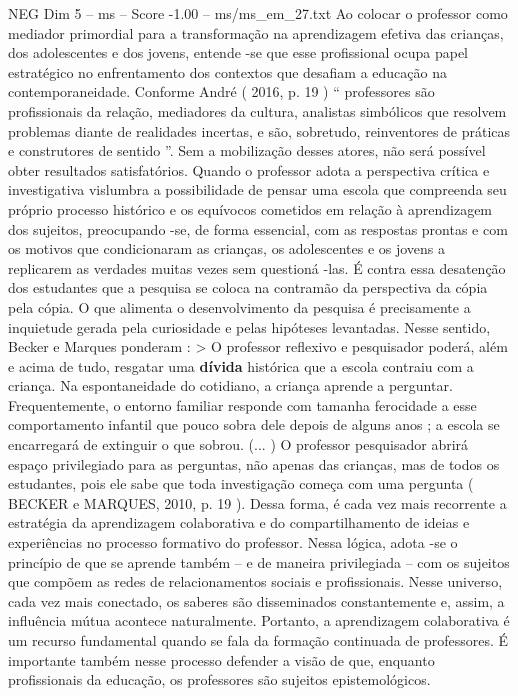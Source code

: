 \begin{textsample}{NEG Dim 5 – ms – Score -1.00 – ms/ms\_em\_27.txt}
Ao colocar o professor como mediador primordial para a transformação na aprendizagem efetiva das crianças, dos adolescentes e dos jovens, entende -se que esse profissional ocupa papel estratégico no enfrentamento dos contextos que desafiam a educação na contemporaneidade.
Conforme André ( 2016, p. 19 ) “ professores são profissionais da relação, mediadores da cultura, analistas simbólicos que resolvem problemas diante de realidades incertas, e são, sobretudo, reinventores de práticas e construtores de sentido ”.
Sem a mobilização desses atores, não será possível obter resultados satisfatórios.
Quando o professor adota a perspectiva crítica e investigativa vislumbra a possibilidade de pensar uma escola que compreenda seu próprio processo histórico e os equívocos cometidos em relação à aprendizagem dos sujeitos, preocupando -se, de forma essencial, com as respostas prontas e com os motivos que condicionaram as crianças, os adolescentes e os jovens a replicarem as verdades muitas vezes sem questioná -las.
É contra essa desatenção dos estudantes que a pesquisa se coloca na contramão da perspectiva da cópia pela cópia.
O que alimenta o desenvolvimento da pesquisa é precisamente a inquietude gerada pela curiosidade e pelas hipóteses levantadas.
Nesse sentido, Becker e Marques ponderam : > O professor reflexivo e pesquisador poderá, além e acima de tudo, resgatar uma \textbf{dívida} histórica que a escola contraiu com a criança.
Na espontaneidade do cotidiano, a criança aprende a perguntar.
Frequentemente, o entorno familiar responde com tamanha ferocidade a esse comportamento infantil que pouco sobra dele depois de alguns anos ; a escola se encarregará de extinguir o que sobrou. (... ) O professor pesquisador abrirá espaço privilegiado para as perguntas, não apenas das crianças, mas de todos os estudantes, pois ele sabe que toda investigação começa com uma pergunta ( BECKER e MARQUES, 2010, p. 19 ).
Dessa forma, é cada vez mais recorrente a estratégia da aprendizagem colaborativa e do compartilhamento de ideias e experiências no processo formativo do professor.
Nessa lógica, adota -se o princípio de que se aprende também – e de maneira privilegiada – com os sujeitos que compõem as redes de relacionamentos sociais e profissionais.
Nesse universo, cada vez mais conectado, os saberes são disseminados constantemente e, assim, a influência mútua acontece naturalmente.
Portanto, a aprendizagem colaborativa é um recurso fundamental quando se fala da formação continuada de professores.
É importante também nesse processo defender a visão de que, enquanto profissionais da educação, os professores são sujeitos epistemológicos.

\end{textsample}

